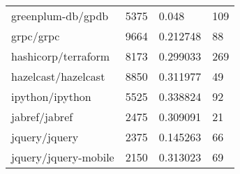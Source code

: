 \begin{table}[]
\begin{tabular}{llll}
greenplum-db/gpdb                           & 5375                               & 0.048                                                                                                             & 109                                                                                                           \\
grpc/grpc                                   & 9664                               & 0.212748                                                                                                          & 88                                                                                                            \\
hashicorp/terraform                         & 8173                               & 0.299033                                                                                                          & 269                                                                                                           \\
hazelcast/hazelcast                         & 8850                               & 0.311977                                                                                                          & 49                                                                                                            \\
ipython/ipython                             & 5525                               & 0.338824                                                                                                          & 92                                                                                                            \\
jabref/jabref                               & 2475                               & 0.309091                                                                                                          & 21                                                                                                            \\
jquery/jquery                               & 2375                               & 0.145263                                                                                                          & 66                                                                                                            \\
jquery/jquery-mobile                        & 2150                               & 0.313023                                                                                                          & 69                                                                                                            \\

\end{tabular}
\end{table}
